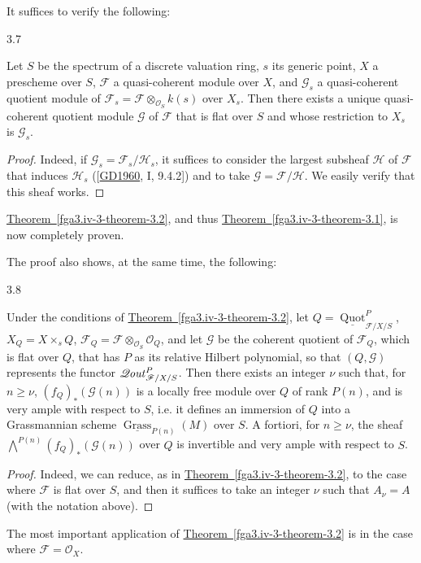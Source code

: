   It suffices to verify the following:\begin{lemma}{3.7}\label{fga3.iv-3-lemma-3.7}\skipsinglepar\par{}Let \(S\) be the spectrum of a discrete valuation ring, \(s\) its generic point, \(X\) a prescheme over \(S\), \(\mathscr {F}\) a quasi-coherent module over \(X\), and \(\mathscr {G}_s\) a quasi-coherent quotient module of \(\mathscr {F}_s=\mathscr {F}\otimes _{\mathcal {O}_S} k(s)\) over \(X_s\).
    Then there exists a unique quasi-coherent quotient module \(\mathscr {G}\) of \(\mathscr {F}\) that is flat over \(S\) and whose restriction to \(X_s\) is \(\mathscr {G}_s\).\begin{proof}\par{}Indeed, if \(\mathscr {G}_s=\mathscr {F}_s/\mathscr {H}_s\), it suffices to consider the largest subsheaf \(\mathscr {H}\) of \(\mathscr {F}\) that induces \(\mathscr {H}_s\) ([\hyperref[GD1960]{GD1960}, I, 9.4.2]) and to take \(\mathscr {G}=\mathscr {F}/\mathscr {H}\).
      We easily verify that this sheaf works.\end{proof}\end{lemma}\par{}\hyperref[fga3.iv-3-theorem-3.2]{Theorem~\ref*{fga3.iv-3-theorem-3.2}}, and thus \hyperref[fga3.iv-3-theorem-3.1]{Theorem~\ref*{fga3.iv-3-theorem-3.1}}, is now completely proven.\par{}The proof also shows, at the same time, the following:\begin{proposition}{3.8}\label{fga3.iv-3-proposition-3.8}\skipsinglepar\par{}Under the conditions of \hyperref[fga3.iv-3-theorem-3.2]{Theorem~\ref*{fga3.iv-3-theorem-3.2}}, let \(Q=\underline {\operatorname {Quot}}_{{\mathscr {F}/X/S}}^P\), \(X_Q=X\times _s Q\), \(\mathscr {F}_Q=\mathscr {F}\otimes _{\mathcal {O}_S}\mathcal {O}_Q\), and let \(\mathscr {G}\) be the coherent quotient of \(\mathscr {F}_Q\), which is flat over \(Q\), that has \(P\) as its relative Hilbert polynomial, so that \((Q,\mathscr {G})\) represents the functor \(\mathscr {Q}\kern  -.75pt\mathit {out}_{{\mathscr {F}/X/S}}^P\).
    Then there exists an integer \(\nu \) such that, for \(n\geqslant \nu \), \((f_Q)_*(\mathscr {G} (n))\) is a locally free module over \(Q\) of rank \(P(n)\), and is very ample with respect to \(S\), i.e. it defines an immersion of \(Q\) into a Grassmannian scheme \(\underline {\operatorname {Grass}}_{P(n)} (M)\) over \(S\).
    A fortiori, for \(n\geqslant \nu \), the sheaf \(\bigwedge ^{P(n)} (f_Q)_*(\mathscr {G} (n))\) over \(Q\) is invertible and very ample with respect to \(S\).\begin{proof}\par{}Indeed, we can reduce, as in \hyperref[fga3.iv-3-theorem-3.2]{Theorem~\ref*{fga3.iv-3-theorem-3.2}}, to the case where \(\mathscr {F}\) is flat over \(S\), and then it suffices to take an integer \(\nu \) such that \(A_\nu =A\) (with the notation above).\end{proof}\end{proposition}\par{}The most important application of \hyperref[fga3.iv-3-theorem-3.2]{Theorem~\ref*{fga3.iv-3-theorem-3.2}} is in the case where \(\mathscr {F}=\mathcal {O}_X\).
